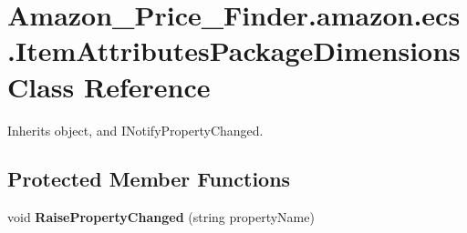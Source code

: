 \hypertarget{class_amazon___price___finder_1_1amazon_1_1ecs_1_1_item_attributes_package_dimensions}{\section{Amazon\-\_\-\-Price\-\_\-\-Finder.\-amazon.\-ecs.\-Item\-Attributes\-Package\-Dimensions Class Reference}
\label{class_amazon___price___finder_1_1amazon_1_1ecs_1_1_item_attributes_package_dimensions}
}


 




Inherits object, and I\-Notify\-Property\-Changed.

\subsection*{Protected Member Functions}
\begin{DoxyCompactItemize}
\item 
\hypertarget{class_amazon___price___finder_1_1amazon_1_1ecs_1_1_item_attributes_package_dimensions_a7f19cae6a80e367a42f8aa71be5018ec}{void {\bfseries Raise\-Property\-Changed} (string property\-Name)}\label{class_amazon___price___finder_1_1amazon_1_1ecs_1_1_item_attributes_package_dimensions_a7f19cae6a80e367a42f8aa71be5018ec}

\end{DoxyCompactItemize}
